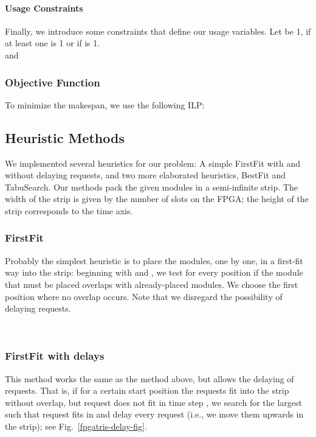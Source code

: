 \documentclass[10pt,journal]{IEEEtran}
\begin{document}
\medskip
\paragraph{Usage Constraints}
Finally, we introduce some constraints that define our usage variables.
Let  be 1, if at least one  is 1 or if 
 is 1.\\


and 


\subsubsection{Objective Function}

To minimize the makespan, we use the following ILP:




\subsection{Heuristic Methods}
We implemented several heuristics for our problem:
A simple FirstFit with and without delaying requests,
and two more elaborated heuristics, BestFit and TabuSearch.
Our methods pack the given modules in a semi-infinite strip.
The width of the strip is given by the number of slots on the FPGA; 
the height of
the strip corresponds to the time axis.

\subsubsection{FirstFit} Probably the simplest heuristic is to place the modules,
one by one, in a first-fit way into the strip: 
beginning with  and ,
we test for every position if the module that must be placed overlaps with
already-placed modules. We choose the first position where no overlap 
occurs. Note that we disregard the possibility of delaying requests.

\pagebreak
~\vspace{-0.5cm}
\subsubsection{FirstFit with delays} 
This method works the same as the method above, but
allows the delaying of requests. That is, if for a certain start position 
the requests  fit into the strip without overlap, 
but request  does not fit in time step , 
we search for the largest  such that
request  fits in  and delay every request 
(i.e., we move them upwards in the strip);
see Fig.~\ref{fpgatris-delay-fig}.
\end{document}
